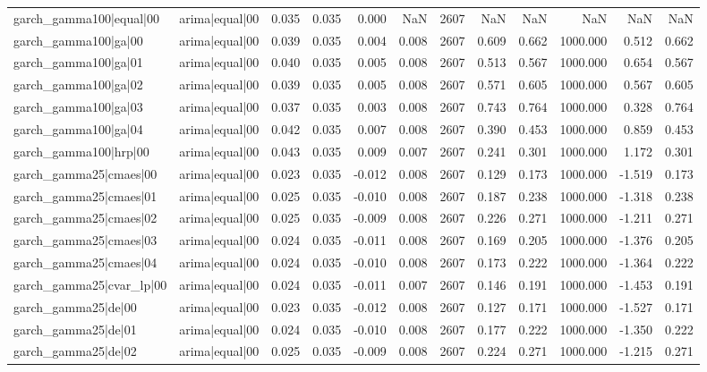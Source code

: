 \begin{table}
\begin{tabular}{llrrrrrrrrrr}
garch\_gamma100|equal|00 & arima|equal|00 & 0.035 & 0.035 & 0.000 & NaN & 2607 & NaN & NaN & NaN & NaN & NaN \\
garch\_gamma100|ga|00 & arima|equal|00 & 0.039 & 0.035 & 0.004 & 0.008 & 2607 & 0.609 & 0.662 & 1000.000 & 0.512 & 0.662 \\
garch\_gamma100|ga|01 & arima|equal|00 & 0.040 & 0.035 & 0.005 & 0.008 & 2607 & 0.513 & 0.567 & 1000.000 & 0.654 & 0.567 \\
garch\_gamma100|ga|02 & arima|equal|00 & 0.039 & 0.035 & 0.005 & 0.008 & 2607 & 0.571 & 0.605 & 1000.000 & 0.567 & 0.605 \\
garch\_gamma100|ga|03 & arima|equal|00 & 0.037 & 0.035 & 0.003 & 0.008 & 2607 & 0.743 & 0.764 & 1000.000 & 0.328 & 0.764 \\
garch\_gamma100|ga|04 & arima|equal|00 & 0.042 & 0.035 & 0.007 & 0.008 & 2607 & 0.390 & 0.453 & 1000.000 & 0.859 & 0.453 \\
garch\_gamma100|hrp|00 & arima|equal|00 & 0.043 & 0.035 & 0.009 & 0.007 & 2607 & 0.241 & 0.301 & 1000.000 & 1.172 & 0.301 \\
garch\_gamma25|cmaes|00 & arima|equal|00 & 0.023 & 0.035 & -0.012 & 0.008 & 2607 & 0.129 & 0.173 & 1000.000 & -1.519 & 0.173 \\
garch\_gamma25|cmaes|01 & arima|equal|00 & 0.025 & 0.035 & -0.010 & 0.008 & 2607 & 0.187 & 0.238 & 1000.000 & -1.318 & 0.238 \\
garch\_gamma25|cmaes|02 & arima|equal|00 & 0.025 & 0.035 & -0.009 & 0.008 & 2607 & 0.226 & 0.271 & 1000.000 & -1.211 & 0.271 \\
garch\_gamma25|cmaes|03 & arima|equal|00 & 0.024 & 0.035 & -0.011 & 0.008 & 2607 & 0.169 & 0.205 & 1000.000 & -1.376 & 0.205 \\
garch\_gamma25|cmaes|04 & arima|equal|00 & 0.024 & 0.035 & -0.010 & 0.008 & 2607 & 0.173 & 0.222 & 1000.000 & -1.364 & 0.222 \\
garch\_gamma25|cvar\_lp|00 & arima|equal|00 & 0.024 & 0.035 & -0.011 & 0.007 & 2607 & 0.146 & 0.191 & 1000.000 & -1.453 & 0.191 \\
garch\_gamma25|de|00 & arima|equal|00 & 0.023 & 0.035 & -0.012 & 0.008 & 2607 & 0.127 & 0.171 & 1000.000 & -1.527 & 0.171 \\
garch\_gamma25|de|01 & arima|equal|00 & 0.024 & 0.035 & -0.010 & 0.008 & 2607 & 0.177 & 0.222 & 1000.000 & -1.350 & 0.222 \\
garch\_gamma25|de|02 & arima|equal|00 & 0.025 & 0.035 & -0.009 & 0.008 & 2607 & 0.224 & 0.271 & 1000.000 & -1.215 & 0.271 \\

\end{tabular}
\end{table}

